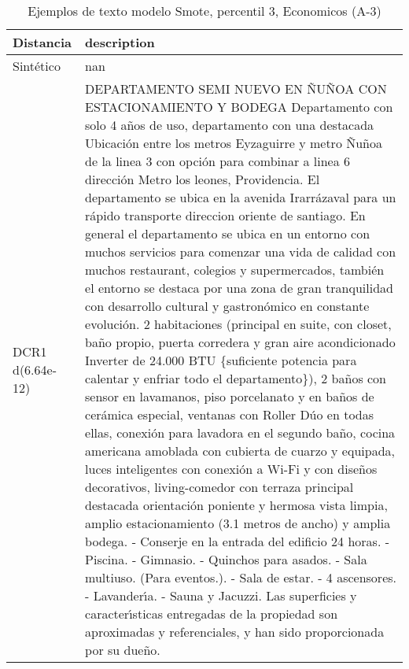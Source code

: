 \begin{table}[H]
\centering
\fontsize{10}{14}\selectfont
\caption{Ejemplos de texto modelo Smote, percentil 3, Economicos (A-3)}
\label{table-example-economicos-a-3-smote-enc-3p-text}
\begin{tabular}{|l|m{35em}|}
\hline
\rowcolor[gray]{0.8}
Distancia & description \\
\hline Sintético & nan \\
\hline DCR1 d(6.64e-12) & DEPARTAMENTO SEMI NUEVO EN \~NU\~NOA CON ESTACIONAMIENTO Y BODEGA  Departamento con solo 4 a\~nos de uso, departamento con una destacada Ubicaci\'on entre los metros Eyzaguirre y metro \~Nu\~noa de la linea 3 con opci\'on para combinar a linea 6 direcci\'on Metro los leones, Providencia. El departamento se ubica en la avenida Irarr\'azaval para un r\'apido transporte direccion oriente de santiago.  En general el departamento se ubica en un entorno con muchos servicios para comenzar una vida de calidad con muchos restaurant, colegios y supermercados, tambi\'en el entorno se destaca por una zona de gran tranquilidad con desarrollo cultural y gastron\'omico en constante evoluci\'on.   2 habitaciones (principal en suite, con closet, ba\~no propio, puerta corredera y gran aire acondicionado Inverter de 24.000 BTU \{suficiente potencia para calentar y enfriar todo el departamento\}), 2 ba\~nos con sensor en lavamanos, piso porcelanato y en ba\~nos de cer\'amica especial, ventanas con Roller D\'uo en todas ellas, conexi\'on para lavadora en el segundo ba\~no, cocina americana amoblada con cubierta de cuarzo y equipada, luces inteligentes con conexi\'on a Wi-Fi y con dise\~nos decorativos, living-comedor con terraza principal destacada orientaci\'on poniente y hermosa vista limpia, amplio estacionamiento (3.1 metros de ancho) y amplia bodega.   - Conserje en la entrada del edificio 24 horas. - Piscina. - Gimnasio. - Quinchos para asados. - Sala multiuso. (Para eventos.). - Sala de estar. - 4 ascensores. - Lavander{\'\i}a. - Sauna y Jacuzzi.   Las superficies y caracter{\'\i}sticas entregadas de la propiedad son aproximadas y referenciales, y han sido proporcionada por su due\~no. \\

\end{tabular}
\end{table}
